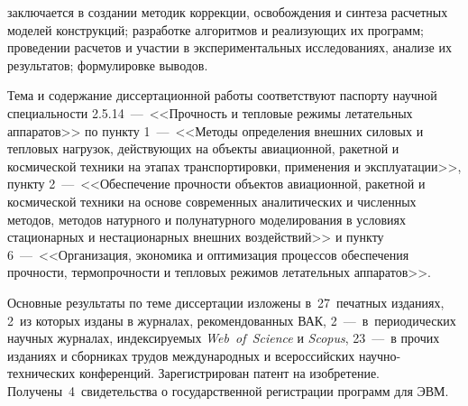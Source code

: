 {\contribution} заключается в создании методик коррекции, освобождения и синтеза расчетных моделей конструкций; разработке алгоритмов и реализующих их программ; проведении расчетов и участии в экспериментальных исследованиях, анализе их результатов; формулировке выводов.

{\pasport}

Тема и содержание диссертационной работы соответствуют паспорту научной специальности 2.5.14~---~<<Прочность и тепловые режимы летательных аппаратов>> по пункту 1~---~<<Методы определения внешних силовых и тепловых нагрузок, действующих на объекты авиационной, ракетной и космической техники на этапах транспортировки, применения и эксплуатации>>, пункту 2~---~<<Обеспечение прочности объектов авиационной, ракетной и космической техники на основе современных аналитических и численных методов, методов натурного и полунатурного моделирования в условиях стационарных и нестационарных внешних воздействий>> и пункту 6~---~<<Организация, экономика и оптимизация процессов обеспечения прочности, термопрочности и тепловых режимов летательных аппаратов>>.

{\publications} 

Основные результаты по теме диссертации изложены в~27~печатных изданиях, 2~из которых изданы в журналах, рекомендованных ВАК, 2~---~в~периодических научных журналах, индексируемых \textit{Web~of~Science} и \textit{Scopus}, 23~---~в прочих изданиях и сборниках трудов международных и всероссийских научно-технических конференций. Зарегистрирован патент на изобретение. Получены~4~свидетельства о государственной регистрации программ для ЭВМ.

